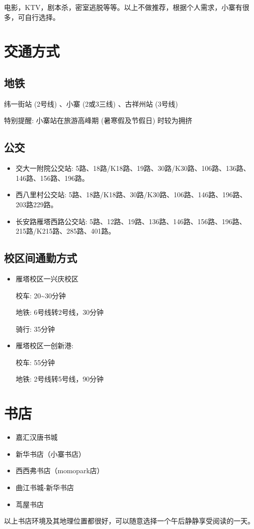 \documentclass[zihao=-4,fontset=none]{Beautybook-CN}
\begin{document}
电影，KTV，剧本杀，密室逃脱等等。以上不做推荐，根据个人需求，小寨有很多，可自行选择。

\section{交通方式}

\subsection{地铁}

纬一街站 (2号线) 、小寨 (2或3三线) 、古祥州站 (3号线)

特别提醒: 小寨站在旅游高峰期 (暑寒假及节假日) 时较为拥挤

\subsection{公交}
\begin{itemize}
    \item 交大一附院公交站: 5路、18路/K18路、19路、30路/K30路、106路、136路、146路、156路、196路。

    \item 西八里村公交站: 5路、18路/K18路、30路/K30路、106路、146路、196路、203路229路。

    \item 长安路雁塔西路公交站: 5路、12路、19路、136路、146路、156路、196路、215路/K215路、285路、401路。
\end{itemize}
\subsection{校区间通勤方式}
\begin{itemize}
    \item 雁塔校区一兴庆校区

校车: 20\textasciitilde{}30分钟

地铁: 6号线转2号线，30分钟

骑行: 35分钟

\item 雁塔校区一创新港:

校车: 55分钟

地铁: 2号线转5号线，90分钟
\end{itemize}


\section{书店}
\begin{itemize}
\item 嘉汇汉唐书城
\item 新华书店（小寨书店）
\item 西西弗书店（momopark店）
\item 曲江书城-新华书店
\item 茑屋书店
\end{itemize}
以上书店环境及其地理位置都很好，可以随意选择一个午后静静享受阅读的一天。
\end{document}
